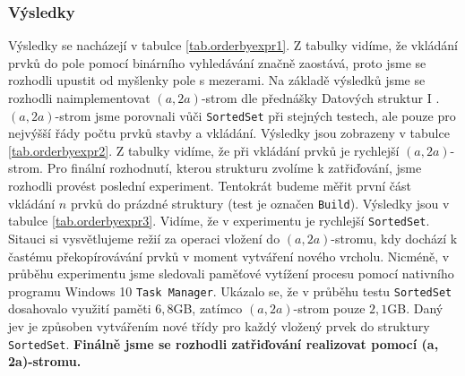 \subsubsection{Výsledky}

Výsledky se nacházejí v tabulce \ref{tab.orderbyexpr1}.
Z tabulky vidíme, že vkládání prvků do pole pomocí binárního vyhledávání značně zaostává, proto jsme se rozhodli upustit od myšlenky pole s mezerami.
Na základě výsledků jsme se rozhodli naimplementovat $(a, 2a)$-strom dle přednášky Datových struktur I \citep{dataLecture}.
$(a, 2a)$-strom jsme porovnali vůči \texttt{SortedSet} při stejných testech, ale pouze pro nejvýšší řády počtu prvků stavby a vkládání.
Výsledky jsou zobrazeny v tabulce \ref{tab.orderbyexpr2}.
Z tabulky vidíme, že při vkládání prvků je rychlejší $(a, 2a)$-strom.
Pro finální rozhodnutí, kterou strukturu zvolíme k zatřiďování, jsme rozhodli provést poslední experiment.
Tentokrát budeme měřit první část vkládání $n$ prvků do prázdné struktury (test je označen \texttt{Build}).
Výsledky jsou v tabulce \ref{tab.orderbyexpr3}.
Vidíme, že v experimentu je rychlejší \texttt{SortedSet}.
Sitauci si vysvětlujeme režií za operaci vložení do $(a, 2a)$-stromu, kdy dochází k častému překopírovávání prvků v moment vytváření nového vrcholu.
Nicméně, v průběhu experimentu jsme sledovali paměťové vytížení procesu pomocí nativního programu Windows 10 \texttt{Task Manager}.
Ukázalo se, že v průběhu testu \texttt{SortedSet} dosahovalo využití paměti $6,8$GB, zatímco $(a, 2a)$-strom pouze $2,1$GB.
Daný jev je způsoben vytvářením nové třídy pro každý vložený prvek do struktury \texttt{SortedSet}.
\textbf{Finálně jsme se rozhodli zatřiďování realizovat pomocí (a, 2a)-stromu.}

